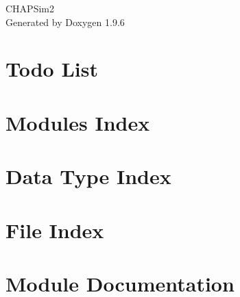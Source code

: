 \documentclass[twoside]{book}
\newcommand{\+}{\discretionary{\mbox{\scriptsize$\hookleftarrow$}}{}{}}
\newcommand{\clearemptydoublepage}{%
    \newpage{\pagestyle{empty}\cleardoublepage}%
  }
\begin{document}
  \raggedbottom
    \hypersetup{pageanchor=false,
                bookmarksnumbered=true,
                pdfencoding=unicode
               }
  \begin{titlepage}
  \vspace*{7cm}
  \begin{center}%
  {\Large CHAPSim2}\\
  \vspace*{1cm}
  {\large Generated by Doxygen 1.9.6}\\
  \end{center}
  \end{titlepage}
  \clearemptydoublepage
  \tableofcontents
  \clearemptydoublepage
  \hypersetup{pageanchor=true}
\chapter{Todo List}
\label{todo}

\chapter{Modules Index}

\chapter{Data Type Index}

\chapter{File Index}

\chapter{Module Documentation}



































\end{document}
